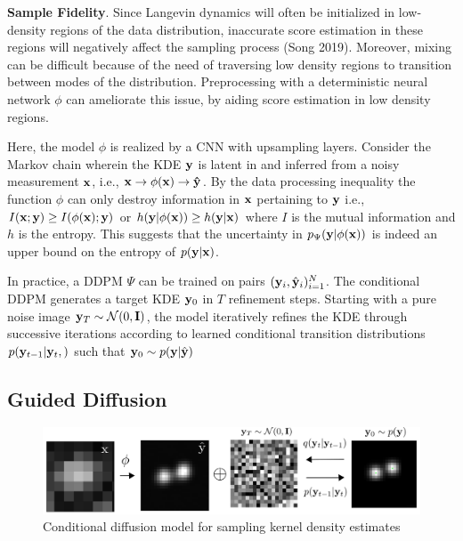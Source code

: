 \documentclass{article}
\begin{document}
\textbf{Sample Fidelity}. Since Langevin dynamics will often be initialized in low-density regions of the data distribution, inaccurate score estimation in these regions will negatively affect the sampling process (Song 2019). Moreover, mixing can be difficult because of the need of traversing low density regions to transition between modes of the distribution. Preprocessing with a deterministic neural network $\phi$ can ameliorate this issue, by aiding score estimation in low density regions. 

Here, the model $\phi$ is realized by a CNN with upsampling layers. Consider the Markov chain wherein the KDE $\bold{y}$ is latent in and inferred from a noisy measurement $\bold{x}$, i.e., $\bold{x} \rightarrow \phi(\bold{x})\rightarrow \bold{\hat{y}}$. By the data processing inequality the function $\phi$ can only destroy information in $\bold{x}$ pertaining to $\bold{y}$ i.e., $I(\bold{x};\bold{y}) \geq I(\phi(\bold{x});\bold{y})$ or $h(\bold{y}|\phi(\bold{x})) \geq h(\bold{y}|\bold{x})$ where $I$ is the mutual information and $h$ is the entropy. This suggests that the uncertainty in $p_{\Psi}(\bold{y}|\phi(\bold{x}))$ is indeed an upper bound on the entropy of $p(\bold{y}|\bold{x})$. 

In practice, a DDPM $\Psi$ can be trained on pairs $(\bold{y}_i,\hat{\bold{y}}_{i})_{i=1}^{N}$. The conditional DDPM generates a target KDE $\bold{y}_0$ in $T$ refinement steps. Starting with a pure noise image $\bold{y}_{T}\sim \mathcal{N}(0,\bold{I})$, the model iteratively refines the KDE through successive iterations according to learned conditional transition distributions $p(\bold{y}_{t-1}|\bold{y}_{t},\bold{})$ such that $\bold{y}_{0} \sim p(\bold{y}|\hat{\bold{y}})$ 

\subsection{Guided Diffusion}

\begin{figure}
\includegraphics[scale=4.5]{Denoise.png}
\caption{Conditional diffusion model for sampling kernel density estimates}
\end{figure}
\end{document}
